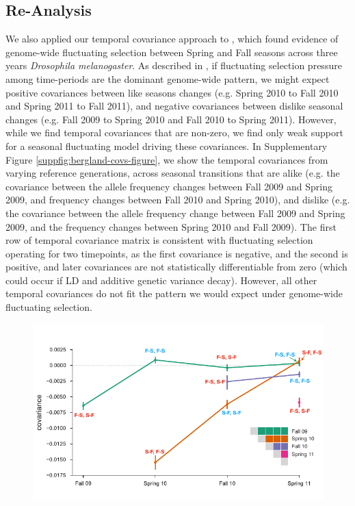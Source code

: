 \documentclass[11pt]{article}
\begin{document}
{\subsection{\textcite{Bergland2014-ij} Re-Analysis}
\label{supp:bergland-reanalysis}


We also applied our temporal covariance approach to \textcite{Bergland2014-ij},
which found evidence of genome-wide fluctuating selection between Spring and
Fall seasons across three years \emph{Drosophila melanogaster}. As described in
\textcite{Buffalo2019-io}, if fluctuating selection pressure among time-periods
are the dominant genome-wide pattern, we might expect positive covariances
between like seasons changes (e.g. Spring 2010 to Fall 2010 and Spring
2011 to Fall 2011), and negative covariances between dislike seasonal changes
(e.g. Fall 2009 to Spring 2010 and Fall 2010 to Spring 2011). However,
while we find temporal covariances that are non-zero, we find only weak support
for a seasonal fluctuating model driving these covariances. In Supplementary
Figure \ref{suppfig:bergland-covs-figure}, we show the temporal covariances
from varying reference generations, across seasonal transitions that are alike
(e.g.  the covariance between the allele frequency changes between Fall 2009
and Spring 2009, and frequency changes between Fall 2010 and Spring 2010), and
dislike (e.g. the covariance between the allele frequency change between Fall
2009 and Spring 2009, and the frequency changes between Spring 2010 and Fall
2009). The first row of temporal covariance matrix is consistent with
fluctuating selection operating for two timepoints, as the first covariance is
negative, and the second is positive, and later covariances are not
statistically differentiable from zero (which could occur if LD and additive
genetic variance decay). However, all other temporal covariances do not fit
the pattern we would expect under genome-wide fluctuating selection.

\begin{figure}[!ht]
  \centering
  \includegraphics[]{figures/bergland-covs-figure.pdf}


\end{figure}}
\end{document}
